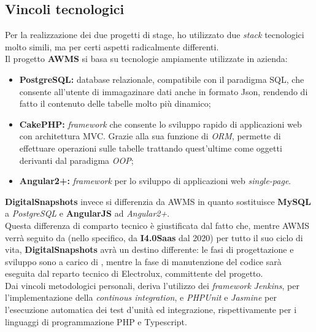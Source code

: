 \subsection{Vincoli tecnologici}

Per la realizzazione dei due progetti di stage, ho utilizzato due \textit{stack} tecnologici molto simili, ma per certi aspetti radicalmente differenti.\\
Il progetto \textbf{AWMS} si basa su tecnologie ampiamente utilizzate in azienda: 
\begin{itemize}
\item \textbf{PostgreSQL:} database relazionale, compatibile con il paradigma SQL, che consente all'utente di immagazinare dati anche in formato Json, rendendo di fatto il contenuto delle tabelle molto più dinamico;
\item \textbf{CakePHP:} \textit{framework} che consente lo sviluppo rapido di applicazioni web con architettura MVC. Grazie alla sua funzione di \textit{ORM}, permette di effettuare operazioni sulle tabelle trattando quest'ultime come oggetti derivanti dal paradigma \textit{OOP};
\item \textbf{Angular2+:} \textit{framework} per lo sviluppo di applicazioni web \textit{single-page}.
\end{itemize}
\textbf{DigitalSnapshots} invece si differenzia da AWMS in quanto sostituisce \textbf{MySQL} a \textit{PostgreSQL} e \textbf{AngularJS} ad \textit{Angular2+}.\\
Questa differenza di comparto tecnico è giustificata dal fatto che, mentre AWMS verrà seguito da \AD{} (nello specifico, da \textbf{I4.0Saas} dal 2020) per tutto il suo ciclo di vita, \textbf{DigitalSnapshots} avrà un destino differente: le fasi di progettazione e sviluppo sono a carico di \AD{}, mentre la fase di manutenzione del codice sarà eseguita dal reparto tecnico di Electrolux, committente del progetto.\\
Dai vincoli metodologici personali, deriva l'utilizzo dei \textit{framework} \textit{Jenkins}, per l'implementazione della \textit{continous integration}, e \textit{PHPUnit} e \textit{Jasmine} per l'esecuzione automatica dei test d'unità ed integrazione, rispettivamente per i linguaggi di programmazione PHP e Typescript.
